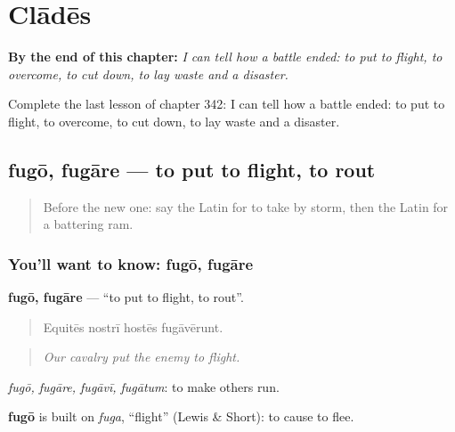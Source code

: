
\chapter{Clādēs}
\label{ch:la-clades}

\begin{chapteropening}
\textbf{By the end of this chapter:} \emph{I can tell how a battle ended: to put to flight, to overcome, to cut down, to lay waste and a disaster.}

Complete the last lesson of chapter 342: I can tell how a battle ended: to put to flight, to overcome, to cut down, to lay waste and a disaster.
\end{chapteropening}

\section[fugō, fugāre]{fugō, fugāre — to put to flight, to rout}

\label{lesson:LA-C342-fugo}



\begin{quote}
Before the new one: say the Latin for to take by storm, then the Latin for a battering ram.
\end{quote}

\subsection*{You'll want to know: fugō, fugāre}
\textbf{fugō, fugāre} — \textquotedblleft{}to put to flight, to rout\textquotedblright{}.

\begin{quote}
Equitēs nostrī hostēs fugāvērunt.
\end{quote}

\begin{quote}
\emph{Our cavalry put the enemy to flight.}
\end{quote}

\emph{fugō, fugāre, fugāvī, fugātum}: to make others run.

\begin{cousinweb}
\textbf{fugō} is built on \emph{fuga}, \textquotedblleft{}flight\textquotedblright{} (Lewis \& Short): to cause to flee.
\end{cousinweb}

